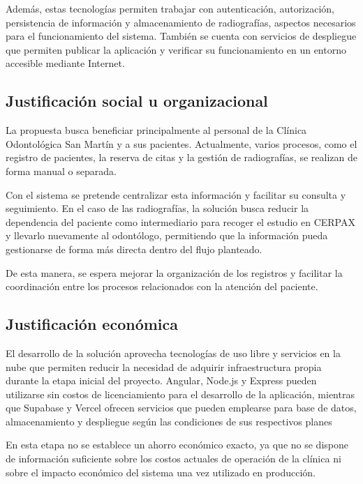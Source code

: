 	Además, estas tecnologías permiten trabajar con autenticación,
	autorización, persistencia de información y almacenamiento de
	radiografías, aspectos necesarios para el funcionamiento del sistema.
	También se cuenta con servicios de despliegue que permiten publicar la
	aplicación y verificar su funcionamiento en un entorno accesible mediante
	Internet.
	
	\subsection{Justificación social u organizacional}
	
	La propuesta busca beneficiar principalmente al personal de la Clínica
	Odontológica San Martín y a sus pacientes. Actualmente, varios procesos,
	como el registro de pacientes, la reserva de citas y la gestión de
	radiografías, se realizan de forma manual o separada.
	
	Con el sistema se pretende centralizar esta información y facilitar su
	consulta y seguimiento. En el caso de las radiografías, la solución busca
	reducir la dependencia del paciente como intermediario para recoger el
	estudio en CERPAX y llevarlo nuevamente al odontólogo, permitiendo que la
	información pueda gestionarse de forma más directa dentro del flujo
	planteado.
	
	De esta manera, se espera mejorar la organización de los registros y
	facilitar la coordinación entre los procesos relacionados con la atención
	del paciente.
	
	\subsection{Justificación económica}
 
 El desarrollo de la solución aprovecha tecnologías de uso libre y servicios
 en la nube que permiten reducir la necesidad de adquirir infraestructura
 propia durante la etapa inicial del proyecto. Angular, Node.js y Express
 pueden utilizarse sin costos de licenciamiento para el desarrollo de la
 aplicación, mientras que Supabase y Vercel ofrecen servicios que pueden
 emplearse para base de datos, almacenamiento y despliegue según las
 condiciones de sus respectivos planes
 
 En esta etapa no se establece un ahorro económico exacto, ya que no se
 dispone de información suficiente sobre los costos actuales de operación
 de la clínica ni sobre el impacto económico del sistema una vez utilizado
 en producción.
 
